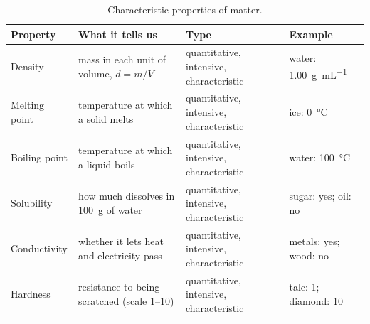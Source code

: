 \begin{table}[H]
    \centering
    \small
    \renewcommand{\arraystretch}{1.35}
    \begin{tabular}{p{2.2cm}p{3.8cm}p{3.0cm}p{3.2cm}}
        \toprule
        \textbf{Property} & \textbf{What it tells us} & \textbf{Type} & \textbf{Example} \\
        \midrule
        Density & mass in each unit of volume, \(d = m/V\) & quantitative, intensive, characteristic & water: \qty{1.00}{\g\per\mL} \\
        Melting point & temperature at which a solid melts & quantitative, intensive, characteristic & ice: \qty{0}{\celsius} \\
        Boiling point & temperature at which a liquid boils & quantitative, intensive, characteristic & water: \qty{100}{\celsius} \\
        Solubility & how much dissolves in \qty{100}{\g} of water & quantitative, intensive, characteristic & sugar: yes; oil: no \\
        Conductivity & whether it lets heat and electricity pass & quantitative, intensive, characteristic & metals: yes; wood: no \\
        Hardness & resistance to being scratched (scale 1--10) & quantitative, intensive, characteristic & talc: 1; diamond: 10 \\
        \bottomrule
    \end{tabular}
    \caption{Characteristic properties of matter.}
    \label{tab:u1_characteristic}
\end{table}

